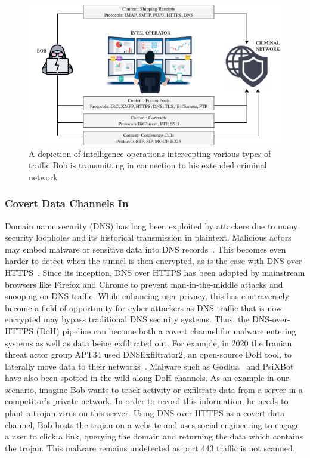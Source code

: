 \begin{figure} [ht!]
\includegraphics[width=\linewidth]{chapters/7/img/attackscenarios.drawio.png}
\caption{A depiction of intelligence operations intercepting various types of traffic Bob is transmitting in connection to his extended criminal network}
\label{fig:attacks}
\end{figure}

\subsubsection{Covert Data Channels In}
Domain name security (DNS) has long been exploited by attackers due to many security loopholes and its historical transmission in plaintext. Malicious actors may embed malware or sensitive data into DNS records~\cite{iscx-doh-paper}. This becomes even harder to detect when the tunnel is then encrypted, as is the case with DNS over HTTPS~\cite{rfc8484}. Since its inception, DNS over HTTPS has been adopted by mainstream browsers like Firefox and Chrome to prevent man-in-the-middle attacks and snooping on DNS traffic. While enhancing user privacy, this has contraversely become a field of opportunity for cyber attackers as DNS traffic that is now encrypted may bypass traditional DNS security systems. Thus, the DNS-over-HTTPS (DoH) pipeline can become both a covert channel for malware entering systems as well as data being exfiltrated out. For example, in 2020 the Iranian threat actor group APT34 used DNSExfiltrator2, an open-source DoH tool, to laterally move data to their networks~\cite{quointelligence-apt34}. Malware such as Godlua~\cite{trendmicro-godlua} and PsiXBot~\cite{proofpoint} have also been spotted in the wild along DoH channels. As an example in our scenario, imagine Bob wants to track activity or exfiltrate data from a server in a competitor's private network. In order to record this information, he needs to plant a trojan virus on this server. Using DNS-over-HTTPS as a covert data channel, Bob hosts the trojan on a website and uses social engineering to engage a user to click a link, querying the domain and returning the data which contains the trojan. This malware remains undetected as port 443 traffic is not scanned.

